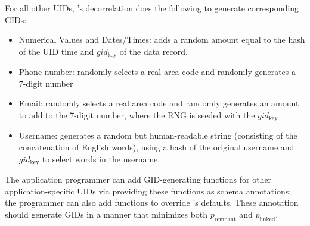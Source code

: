 For all other UIDs, \sys's decorrelation does the following to generate corresponding GIDs:
\begin{itemize}
    \item Numerical Values and Dates/Times: adds a random amount equal to the
         hash of the UID time and $gid_\text{key}$ of the data record.
    \item Phone number: randomly selects a real area code and randomly generates a 7-digit number
    \item Email: randomly selects a real area code and randomly generates an amount to add to the 7-digit number, where the RNG is seeded with the $gid_\text{key}$
    \item Username: generates a random but human-readable string (consisting of the
        concatenation of English words), using a hash of the original username and
        $gid_\text{key}$ to select words in the username.
\end{itemize}
The application programmer can add GID-generating functions for other application-specific UIDs
via providing these functions as schema annotations; the programmer can also add functions to override \sys's defaults.
These annotation should generate GIDs in a manner that minimizes both $p_\text{remnant}$ and $p_\text{linked}$.

